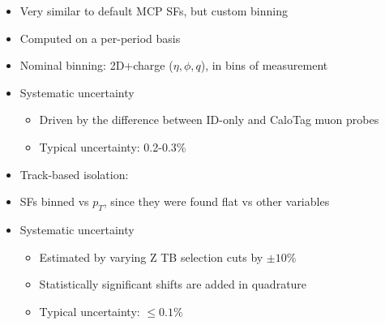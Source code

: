 {

\begin{itemize}
\item Very similar to default MCP SFs, but custom binning
\item Computed on a per-period basis
\item Nominal binning: 2D+charge ($\eta,\phi,q$), in bins of measurement
\item Systematic uncertainty
\begin{itemize}
\item Driven by the difference between ID-only and CaloTag muon probes
\item Typical uncertainty: 0.2-0.3\%
\end{itemize}
\end{itemize}

\vspace{-0.5cm}

\begin{figure}
  \centering
\end{figure}

}

{
\begin{itemize}
\item Track-based isolation: \TrackIsoMu
\item SFs binned vs $p_T$, since they were found flat vs other variables
\item Systematic uncertainty
\begin{itemize}
\item Estimated by varying Z TB selection cuts by $\pm10\%$
\item Statistically significant shifts are added in quadrature
\item Typical uncertainty: $\leq 0.1\%$
\end{itemize}

\end{itemize}

\vspace{-0.5cm}

\begin{figure}
  \centering
\end{figure}

}

